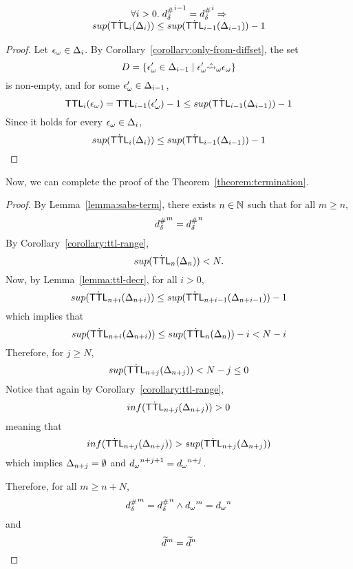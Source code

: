 \begin{lemma}\label{lemma:ttl-decr}
  \[
    \begin{array}{c}
      \forall i > 0. \; {{d}^{\#}_\delta}^{i-1} = {{d}^{\#}_\delta}^i \Rightarrow \\
      sup(\dot {\textsf{TTL}}_i(\Delta_i)) \leq sup(\dot {\textsf{TTL}}_{i-1}(\Delta_{i-1})) - 1
    \end{array}
  \]
\end{lemma}
\begin{proof}
  Let ${\epsilon}_\omega \in \Delta_i$.
  By Corollary~\ref{corollary:only-from-diffset}, the set
  \[
    D = \{{\epsilon}_\omega' \in \Delta_{i-1} \mid {\epsilon}_\omega' \hat{\leadsto}_\omega {\epsilon}_\omega\}
  \]
  is non-empty, and for some ${\epsilon}_\omega' \in \Delta_{i-1}$,
  \[
    \textsf{TTL}_i({\epsilon}_\omega) = \textsf{TTL}_{i-1}({\epsilon}_\omega') - 1 \leq sup(\dot {\textsf{TTL}}_{i-1}(\Delta_{i-1})) - 1
  \]
  Since it holds for every ${\epsilon}_\omega \in \Delta_i$,
  \[
    sup(\dot {\textsf{TTL}}_i(\Delta_i)) \leq sup(\dot {\textsf{TTL}}_{i-1}(\Delta_{i-1})) - 1
  \]
\end{proof}

Now, we can complete the proof of the Theorem~\ref{theorem:termination}.

\begin{proof}
By Lemma~\ref{lemma:sabs-term}, there exists $n \in \mathbb{N}$ such that
for all $m \geq n$,
\[
  {{d}^{\#}_\delta}^m = {{d}^{\#}_\delta}^n
\]
By Corollary~\ref{corollary:ttl-range},
\[
  sup(\dot {\textsf{TTL}}_n(\Delta_n)) < N.
\]
Now, by Lemma~\ref{lemma:ttl-decr}, for all $i>0$,
\[
  sup(\dot {\textsf{TTL}}_{n+i}(\Delta_{n+i})) \leq sup(\dot {\textsf{TTL}}_{n+i-1}(\Delta_{n+i-1})) - 1
\]
which implies that
\[
  sup(\dot {\textsf{TTL}}_{n+i}(\Delta_{n+i})) \leq sup(\dot {\textsf{TTL}}_n(\Delta_n)) - i < N - i
\]
Therefore, for $j \geq N$,
\[
  sup(\dot {\textsf{TTL}}_{n+j}(\Delta_{n+j})) < N - j \leq 0
\]
Notice that again by Corollary~\ref{corollary:ttl-range},
\[
  inf(\dot {\textsf{TTL}}_{n+j}(\Delta_{n+j})) > 0
\]
meaning that
\[
  inf(\dot {\textsf{TTL}}_{n+j}(\Delta_{n+j})) > sup(\dot {\textsf{TTL}}_{n+j}(\Delta_{n+j}))
\]
which implies $\Delta_{n+j} = \emptyset$ and
${{d}_\omega}^{n+j+1} = {{d}_\omega}^{n+j}$.

Therefore, for all $m \geq n + N$,
\[
  {{d}^{\#}_\delta}^m = {{d}^{\#}_\delta}^n \wedge {{d}_\omega}^m = {{d}_\omega}^n
\]
and
\[
  \widetilde{d}^m = \widetilde{d}^n
\]

\end{proof}
